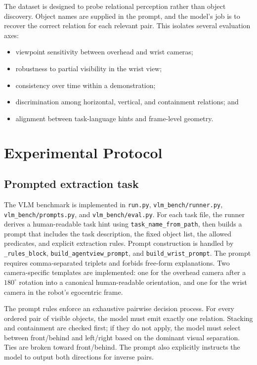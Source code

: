 \documentclass{article}
\begin{document}
The dataset is designed to probe relational perception rather than object discovery. Object names are supplied in the prompt, and the model's job is to recover the correct relation for each relevant pair. This isolates several evaluation axes:
\begin{itemize}
    \item viewpoint sensitivity between overhead and wrist cameras;
    \item robustness to partial visibility in the wrist view;
    \item consistency over time within a demonstration;
    \item discrimination among horizontal, vertical, and containment relations; and
    \item alignment between task-language hints and frame-level geometry.
\end{itemize}

\section{Experimental Protocol}
\subsection{Prompted extraction task}
The VLM benchmark is implemented in \texttt{run.py}, \texttt{vlm\_bench/runner.py}, \texttt{vlm\_bench/prompts.py}, and \texttt{vlm\_bench/eval.py}. For each task file, the runner derives a human-readable task hint using \texttt{task\_name\_from\_path}, then builds a prompt that includes the task description, the fixed object list, the allowed predicates, and explicit extraction rules. Prompt construction is handled by \texttt{\_rules\_block}, \texttt{build\_agentview\_prompt}, and \texttt{build\_wrist\_prompt}. The prompt requires comma-separated triplets and forbids free-form explanations. Two camera-specific templates are implemented: one for the overhead camera after a $180^\circ$ rotation into a canonical human-readable orientation, and one for the wrist camera in the robot's egocentric frame.

The prompt rules enforce an exhaustive pairwise decision process. For every ordered pair of visible objects, the model must emit exactly one relation. Stacking and containment are checked first; if they do not apply, the model must select between front/behind and left/right based on the dominant visual separation. Ties are broken toward front/behind. The prompt also explicitly instructs the model to output both directions for inverse pairs.
\end{document}
